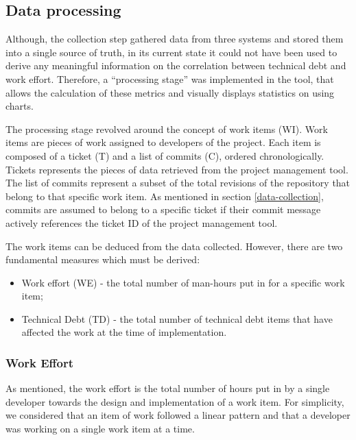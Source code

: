 \documentclass{mpaper}
\begin{document}
\subsection{Data processing}
\label{data-processing}

Although, the collection step gathered data from three systems and stored them
into a single source of truth, in its current state it could not have been used
to derive any meaningful information on the correlation between technical debt
and work effort. Therefore, a ``processing stage'' was implemented in the tool,
that allows the calculation of these metrics and visually displays statistics on
using charts.

The processing stage revolved around the concept of work items (WI). Work items
are pieces of work assigned to developers of the project. Each item is composed
of a ticket (T) and a list of commits (C), ordered chronologically. Tickets
represents the pieces of data retrieved from the project management tool. The
list of commits represent a subset of the total revisions of the repository that
belong to that specific work item. As mentioned in section
\ref{data-collection}, commits are assumed to belong to a specific ticket if
their commit message actively references the ticket ID of the project management
tool.

The work items can be deduced from the data collected. However, there are two
fundamental measures which must be derived:
\begin{itemize}
  \item Work effort (WE) - the total number of man-hours put in for a specific
  work item;
  \item Technical Debt (TD) - the total number of technical debt items that have
  affected the work at the time of implementation.
\end{itemize}

\subsubsection*{Work Effort}
\label{work-effort}

As mentioned, the work effort is the total number of hours put in by a single
developer towards the design and implementation of a work item. For simplicity,
we considered that an item of work followed a linear pattern and that a
developer was working on a single work item at a time.
\end{document}
